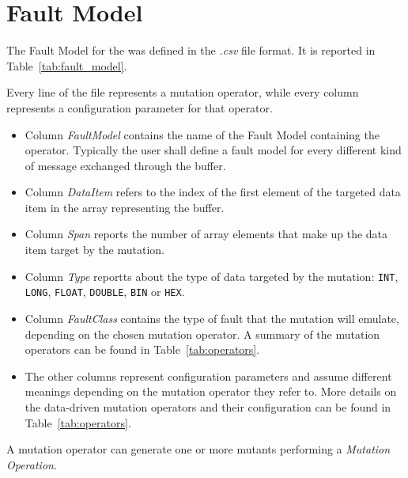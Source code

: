 \section{Fault Model}

The Fault Model for the \case was defined in the \emph{.csv} file format. It is reported in Table~\ref{tab:fault_model}.



Every line of the file represents a mutation operator, while every column represents a configuration parameter for that operator.

\begin{itemize}
  \item Column \emph{FaultModel} contains the name of the Fault Model containing the operator. Typically the user shall define a fault model for every different kind of message exchanged through the buffer.

  \item Column \emph{DataItem} refers to the index of the first element of the targeted data item in the array representing the buffer.

  \item Column \emph{Span} reports the number of array elements that make up the data item target by the mutation.

  \item Column \emph{Type} reportts about the type of data targeted by the mutation: \texttt{INT}, \texttt{LONG}, \texttt{FLOAT}, \texttt{DOUBLE}, \texttt{BIN} or \texttt{HEX}.

  \item Column \emph{FaultClass} contains the type of fault that the mutation will emulate, depending on the chosen mutation operator. A summary of the mutation operators can be found in Table~\ref{tab:operators}.

  \item The other columns represent configuration parameters and assume different meanings depending on the mutation operator they refer to. More details on the data-driven mutation operators and their configuration can be found in Table~\ref{tab:operators}.

\end{itemize}



A mutation operator can generate one or more mutants performing a \emph{Mutation Operation}.
